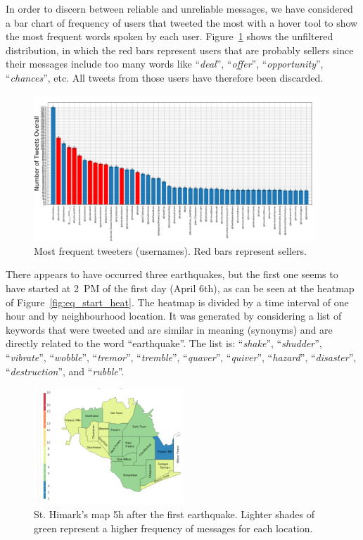 In order to discern between reliable and unreliable messages, we have considered
a bar chart of frequency of users that tweeted the most with a hover tool to
show the most frequent words spoken by each user.
Figure~\ref{fig:most_freq_users} shows the unfiltered distribution, in which the
red bars represent users that are probably sellers since their messages include
too many words like ``\emph{deal}'', ``\emph{offer}'', ``\emph{opportunity}'',
``\emph{chances}'', etc. All tweets from those users have therefore been
discarded.

\begin{figure}[!h]
    \centering
    \includegraphics[width=0.95\textwidth]{figs/q1/most_freq_users.png}
    \caption{Most frequent tweeters (usernames). Red bars represent sellers.}
    \label{fig:most_freq_users}
\end{figure}

There appears to have occurred three earthquakes, but the first one seems to
have started at 2~PM of the first day (April 6th), as
can be seen at the heatmap of Figure~\ref{fig:eq_start_heat}. The heatmap is
divided by a time interval of one hour and by neighbourhood location. It was
generated by considering a list of keywords that were tweeted and are similar in 
meaning (synonyms) and are directly related to the word ``earthquake''. The list 
is: ``\emph{shake}'', ``\emph{shudder}'', ``\emph{vibrate}'', ``\emph{wobble}'',
``\emph{tremor}'', ``\emph{tremble}'', ``\emph{quaver}'', ``\emph{quiver}'',
``\emph{hazard}'', ``\emph{disaster}'', ``\emph{destruction}'', and
``\emph{rubble}''.

\begin{figure}[!h]
    \centering
    \includegraphics[width=0.50\textwidth]{figs/q1/cond_5h/cond_5h_svg.png}
    \caption{St. Himark's map 5h after the first earthquake. Lighter shades of
    green represent a higher frequency of messages for each location.}
    \label{fig:map_5h}
\end{figure}

